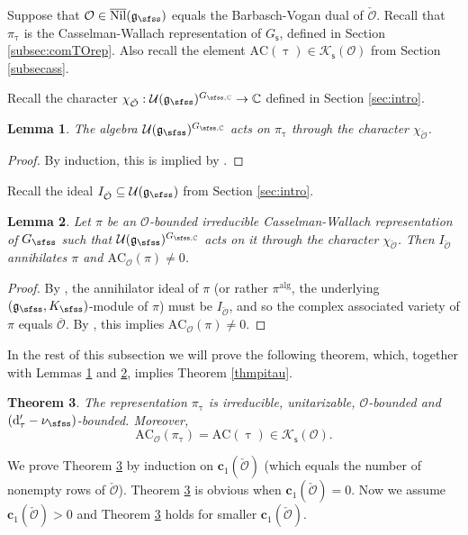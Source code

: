 \documentclass[11pt,a4paper]{amsart}
\newcommand{\CK}{{\mathcal {K}}}
\newcommand{\CO}{{\mathcal {O}}}
\newcommand{\CU}{{\mathcal {U}}}
\newcommand{\g}{\mathfrak g}
\numberwithin{equation}{section}
\newtheorem{thm}{Theorem}[section]
\newtheorem{lem}[thm]{Lemma}
\theoremstyle{remark}
\def\subset{\subseteq}
\def\Nil{\overline{\mathrm{Nil}}}
\begin{document}
Suppose that $\CO\in \Nil(\g_\sfss)$ equals the Barbasch-Vogan dual of $\check \CO$.   Recall that $\pi_\uptau$ is the Casselman-Wallach representation of $G_{\mathsf s}$, defined in Section \ref{subsec:comTOrep}.
Also recall the element $\mathrm{AC}(\uptau)\in \CK_{\mathsf s}(\CO)$ from Section \ref{subsecass}.

Recall the character $\chi_{\check \CO}: \CU(\g_\sfss)^{G_{\sfss, \C}}\rightarrow \C$  defined in Section \ref{sec:intro}.
\begin{lem}\label{inf1}
The algebra $\CU(\g_\sfss)^{G_{\sfss, \C}}$ acts on $\pi_\uptau$ through the character $\chi_{\check \CO}$.%
\end{lem}
\begin{proof}
By induction, this is implied by \cite[Theorem
1.19]{PrzInf}.
\end{proof}



Recall the ideal $I_{\check \CO}\subset \mathcal U(\g_\sfss)$ from Section \ref{sec:intro}.
\begin{lem}\label{inf2}
Let $\pi$ be an $\CO$-bounded irreducible Casselman-Wallach representation of $G_{\sfss}$ such that $\mathcal U(\g_\sfss)^{G_{\sfss, \C}}$ acts on it  through the character $\chi_{\check \CO}$. Then $I_{\check \CO}$ annihilates $\pi$ and $\mathrm{AC}_{\CO}(\pi)\neq 0$.
\end{lem}

\begin{proof}
By \cite[Korollar 3.6]{BK}, the annihilator ideal of $\pi$ (or rather $\pi^{\mathrm{alg}}$, the  underlying $(\g_\sfss, K_\sfss)$-module of $\pi$) must be $I_{\check \CO}$, and so the complex associated variety of $\pi$ equals $\overline \CO$. By \cite[Theorem 8.4]{Vo89}, this implies $\mathrm{AC}_{\CO}(\pi)\neq 0$.
\end{proof}


In the rest of this subsection we will prove the following theorem, which, together with Lemmas \ref{inf1} and \ref{inf2},  implies  Theorem \ref{thmpitau}.
\begin{thm}\label{thmpitau222}
The representation $\pi_\uptau$ is irreducible, unitarizable, $\CO$-bounded and $( \mathrm d'_\tau-\nu_{\sfss})$-bounded.     Moreover,
\[
\mathrm{AC}_\CO(\pi_\uptau)=\mathrm{AC}(\uptau)\in \CK_{\mathsf s}(\CO).
\]
\end{thm}

We prove Theorem \ref{thmpitau222} by induction on $\mathbf c_1(\check \CO)$ (which equals the number of nonempty rows of $\check \CO$).  Theorem \ref{thmpitau222} is obvious when $\mathbf c_1(\check \CO)=0$. Now we assume $\mathbf c_1(\check \CO)>0$ and Theorem \ref{thmpitau222} holds for  smaller $\mathbf c_1(\check \CO)$.
\end{document}
